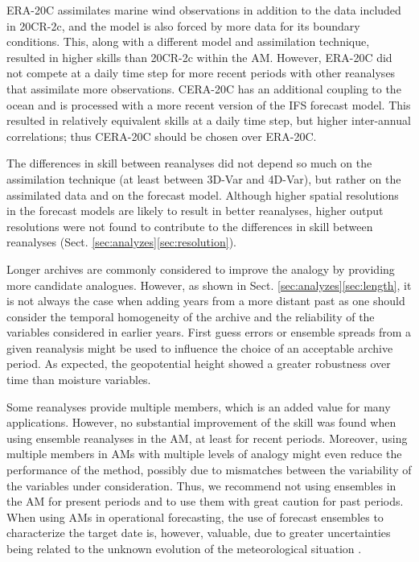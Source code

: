 \documentclass{ametsoc}
\begin{document}
	ERA-20C assimilates marine wind observations in addition to the data included in 20CR-2c, and the model is also forced by more data for its boundary conditions. This, along with a different model and assimilation technique, resulted in higher skills than 20CR-2c within the AM. However, ERA-20C did not compete at a daily time step for more recent periods with other reanalyses that assimilate more observations. CERA-20C has an additional coupling to the ocean and is processed with a more recent version of the IFS forecast model. This resulted in relatively equivalent skills at a daily time step, but higher inter-annual correlations; thus CERA-20C should be chosen over ERA-20C.
	
	The differences in skill between reanalyses did not depend so much on the assimilation technique (at least between 3D-Var and 4D-Var), but rather on the assimilated data and on the forecast model. Although higher spatial resolutions in the forecast models are likely to result in better reanalyses, higher output resolutions were not found to contribute to the differences in skill between reanalyses (Sect. \ref{sec:analyzes}\ref{sec:resolution}). 
	
	Longer archives are commonly considered to improve the analogy by providing more candidate analogues. However, as shown in Sect. \ref{sec:analyzes}\ref{sec:length}, it is not always the case when adding years from a more distant past as one should consider the temporal homogeneity of the archive and the reliability of the variables considered in earlier years. First guess errors or ensemble spreads from a given reanalysis might be used to influence the choice of an acceptable archive period. As expected, the geopotential height showed a greater robustness over time than moisture variables. 
	
	Some reanalyses provide multiple members, which is an added value for many applications. However, no substantial improvement of the skill was found when using ensemble reanalyses in the AM, at least for recent periods. Moreover, using multiple members in AMs with multiple levels of analogy might even reduce the performance of the method, possibly due to mismatches between the variability of the variables under consideration. Thus, we recommend not using ensembles in the AM for present periods and to use them with great caution for past periods. When using AMs in operational forecasting, the use of forecast ensembles to characterize the target date is, however, valuable, due to greater uncertainties being related to the unknown evolution of the meteorological situation \citep{Thevenot2004}.
	
\end{document}
